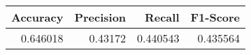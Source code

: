 \begin{tabular}{rrrr}
\toprule
 Accuracy &  Precision &   Recall &  F1-Score \\
\midrule
 0.646018 &    0.43172 & 0.440543 &  0.435564 \\
\bottomrule
\end{tabular}
